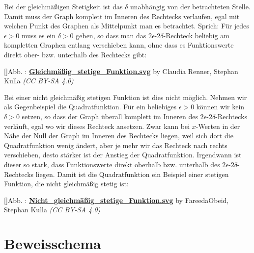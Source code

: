 \documentclass[fontsize=9pt,
               parskip=half-,
               DIV=14,
               listof=chapterentry,
               tocflat]{scrbook}
\newcounter{imagelabel}
\begin{document}
Bei der gleichmäßigen Stetigkeit ist das $\delta $ unabhängig von der betrachteten Stelle. Damit muss der Graph komplett im Inneren des Rechtecks verlaufen, egal mit welchen Punkt des Graphen als Mittelpunkt man es betrachtet. Sprich: Für jedes $\epsilon >0$ muss es ein $\delta >0$ geben, so dass man das $2\epsilon $-$2\delta $-Rechteck beliebig am kompletten Graphen entlang verschieben kann, ohne dass es Funktionswerte direkt ober- bzw. unterhalb des Rechtecks gibt:

[]{Abb. : \protect\href{https://commons.wikimedia.org/wiki/File:Gleichmäßig_stetige_Funktion.svg}{\textbf{Gleichmäßig\allowbreak\_stetige\allowbreak\_Funktion.svg}} by Claudia Renner, Stephan Kulla \textit{(CC BY-SA 4.0)}}\begin{center}
\end{center}

Bei einer nicht gleichmäßig stetigen Funktion ist dies nicht möglich. Nehmen wir als Gegenbeispiel die Quadratfunktion. Für ein beliebiges $\epsilon >0$ können wir kein $\delta >0$ setzen, so dass der Graph überall komplett im Inneren des $2\epsilon $-$2\delta $-Rechtecks verläuft, egal wo wir dieses Rechteck ansetzen. Zwar kann bei $x$-Werten in der Nähe der Null der Graph im Inneren des Rechtecks liegen, weil sich dort die Quadratfunktion wenig ändert, aber je mehr wir das Rechteck nach rechts verschieben, desto stärker ist der Anstieg der Quadratfunktion. Irgendwann ist dieser so stark, dass Funktionswerte direkt oberhalb bzw. unterhalb des $2\epsilon $-$2\delta $-Rechtecks liegen. Damit ist die Quadratfunktion ein Beispiel einer stetigen Funktion, die nicht gleichmäßig stetig ist:

[]{Abb. : \protect\href{https://commons.wikimedia.org/wiki/File:Nicht_gleichmäßig_stetige_Funktion.svg}{\textbf{Nicht\allowbreak\_gleichmäßig\allowbreak\_stetige\allowbreak\_Funktion.svg}} by FareedaObeid, Stephan Kulla \textit{(CC BY-SA 4.0)}}\begin{center}
\end{center}

\section{Beweisschema}
\end{document}
